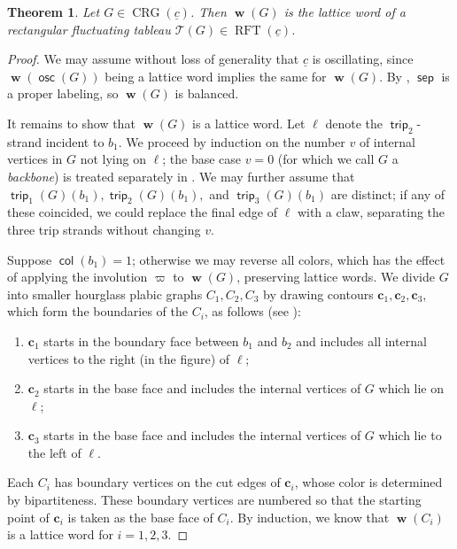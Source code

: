 \documentclass{amsart}
\newtheorem{theorem}{Theorem}[section]
\theoremstyle{definition}
\theoremstyle{remark}
\numberwithin{equation}{section}
\DeclareMathOperator{\trip}{\mathsf{trip}}
\DeclareMathOperator{\col}{\mathsf{col}}
\DeclareMathOperator{\osc}{\mathsf{osc}}
\DeclareMathOperator{\bw}{\mathbf{w}}
\DeclareMathOperator{\rft}{RFT}
\DeclareMathOperator{\sep}{\mathsf{sep}}
\DeclareMathOperator{\crg}{CRG}
\newcommand{\bs}{\boldsymbol}
\begin{document}
\begin{theorem}
\label{thm:sep-label-gives-lattice-word}
Let $G \in \crg(\underline{c})$. Then $\bw(G)$ is the lattice word of a rectangular fluctuating tableau $\mathcal{T}(G) \in \rft(\underline{c})$.
\end{theorem}
\begin{proof}
We may assume without loss of generality that $\underline{c}$ is oscillating, since $\bw(\osc(G))$ being a lattice word implies the same for $\bw(G)$. By , $\sep$ is a proper labeling, so $\bw(G)$ is balanced.

It remains to show that $\bw(G)$ is a lattice word. Let $\ell$ denote the $\trip_2$-strand incident to $b_1$. We proceed by induction on the number $v$ of internal vertices in $G$ not lying on $\ell$; the base case $v=0$ (for which we call $G$ a \emph{backbone}) is treated separately in . We may further assume that $\trip_1(G)(b_1),\trip_2(G)(b_1),$ and $\trip_3(G)(b_1)$ are distinct; if any of these coincided, we could replace the final edge of $\ell$ with a claw, separating the three trip strands without changing $v$.


Suppose $\col(b_1)=1$; otherwise we may reverse all colors, which has the effect of applying the involution $\varpi$ to $\bw(G)$, preserving lattice words. We divide $G$ into smaller hourglass plabic graphs $C_1,C_2,C_3$ by drawing contours $\bs{c}_1, \bs{c}_2, \bs{c}_3$, which form the boundaries of the $C_i$, as follows (see ):
\begin{enumerate}
    \item[(1)] $\bs{c}_1$ starts in the boundary face between $b_1$ and $b_2$ and includes all internal vertices to the right (in the figure) of $\ell$;
    \item[(2)] $\bs{c}_2$ starts in the base face and includes the internal vertices of $G$ which lie on $\ell$;
    \item[(3)] $\bs{c}_3$ starts in the base face and includes the internal vertices of $G$ which lie to the left of $\ell$.
\end{enumerate}
Each $C_i$ has boundary vertices on the cut edges of $\bs{c}_i$, whose color is determined by bipartiteness. These boundary vertices are numbered so that the starting point of $\bs{c}_i$ is taken as the base face of $C_i$. By induction, we know that $\bw(C_i)$ is a lattice word for $i=1,2,3$. 


\end{proof}
\end{document}
